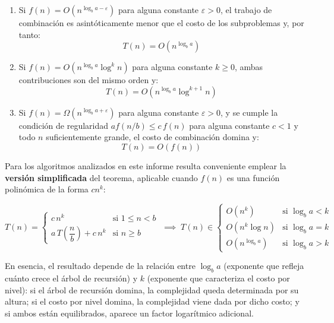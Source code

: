 \begin{enumerate}
  \item Si $f(n) = O\!\left(n^{\log_b a - \varepsilon}\right)$ para alguna constante $\varepsilon > 0$, el trabajo de combinación es asintóticamente menor que el costo de los subproblemas y, por tanto: \[T(n) = O\!\left(n^{\log_b a}\right)\]
  \item Si $f(n) = O\!\left(n^{\log_b a}\log^k n\right)$ para alguna constante $k \geq 0$, ambas contribuciones son del mismo orden y: \[T(n) = O\!\left(n^{\log_b a}\log^{k+1} n\right)\]
  \item Si $f(n) = \Omega\!\left(n^{\log_b a + \varepsilon}\right)$ para alguna constante $\varepsilon > 0$, y se cumple la condición de regularidad $af(n/b) \leq c\,f(n)$ para alguna constante $c < 1$ y todo $n$ suficientemente grande, el costo de combinación domina y: \[T(n) = O(f(n))\]
\end{enumerate}

Para los algoritmos analizados en este informe resulta conveniente emplear la \textbf{versión simplificada} del teorema, aplicable cuando $f(n)$ es una función polinómica de la forma $cn^k$:

\[
\boxed{
T(n) =
\begin{cases}
  c\,n^k & \text{si } 1 \leq n < b \\[4pt]
  a\,T\!\left(\dfrac{n}{b}\right) + c\,n^k & \text{si } n \geq b
\end{cases}
\;\implies\;
T(n) \in
\begin{cases}
  O(n^k)          & \text{si } \log_b a < k \\[4pt]
  O(n^k \log n)   & \text{si } \log_b a = k \\[4pt]
  O(n^{\log_b a}) & \text{si } \log_b a > k
\end{cases}
}
\]

En esencia, el resultado depende de la relación entre $\log_b a$ (exponente que refleja cuánto crece el árbol de recursión) y $k$ (exponente que caracteriza el costo por nivel): si el árbol de recursión domina, la complejidad queda determinada por su altura; si el costo por nivel domina, la complejidad viene dada por dicho costo; y si ambos están equilibrados, aparece un factor logarítmico adicional.
